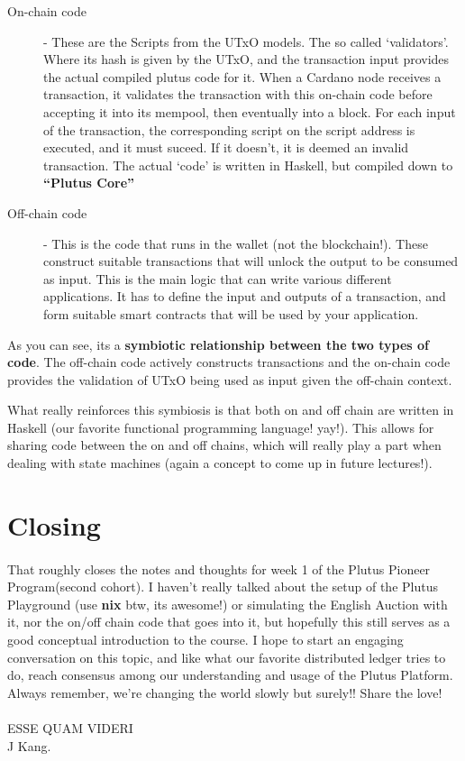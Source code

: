 \documentclass[a4paper, 11pt]{article}
\begin{document}
    \begin{description}
        \item[On-chain code] - These are the Scripts from the UTxO models. The so called `validators'. Where its hash is given by the UTxO, and the transaction input provides the actual compiled plutus code for it. When a Cardano node receives a transaction, it validates the transaction with this on-chain code before accepting it into its mempool, then eventually into a block. For each input of the transaction, the corresponding script on the script address is executed, and it must suceed. If it doesn't, it is deemed an invalid transaction. The actual `code' is written in Haskell, but compiled down to \textbf{``Plutus Core''}
         
        \item[Off-chain code] - This is the code that runs in the wallet (not the blockchain!). These construct suitable transactions that will unlock the output to be consumed as input. This is the main logic that can write various different applications. It has to define the input and outputs of a transaction, and form suitable smart contracts that will be used by your application.    
    \end{description}

    As you can see, its a \textbf{symbiotic relationship between the two types of code}. The off-chain code actively constructs transactions and the on-chain code provides the validation of UTxO being used as input given the off-chain context.

    What really reinforces this symbiosis is that both on and off chain are written in Haskell (our favorite functional programming language! yay!). This allows for sharing code between the on and off chains, which will really play a part when dealing with state machines (again a concept to come up in future lectures!).

    \section{Closing}
    \paragraph{} That roughly closes the notes and thoughts for week 1 of the Plutus Pioneer Program(second cohort). I haven't really talked about the setup of the Plutus Playground (use \textbf{nix} btw, its awesome!) or simulating the English Auction with it, nor the on/off chain code that goes into it, but hopefully this still serves as a good conceptual introduction to the course. I hope to start an engaging conversation on this topic, and like what our favorite distributed ledger tries to do, reach consensus among our understanding and usage of the Plutus Platform. Always remember, we're changing the world slowly but surely!! Share the love! \heartsuit


    \paragraph{}ESSE QUAM VIDERI\\
    J Kang.
\end{document}

